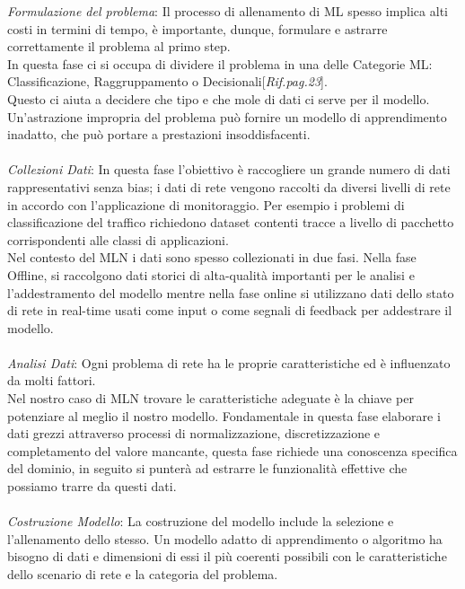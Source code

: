 \documentclass[../tesi.tex]{subfiles}
\begin{document}
\textit{Formulazione del problema}: Il processo di allenamento di ML spesso implica alti costi in termini di tempo, è importante, dunque, formulare e astrarre correttamente il problema al primo step.\\
In questa fase ci si occupa di dividere il problema in una delle Categorie ML: Classificazione, Raggruppamento o Decisionali[\textit{Rif.pag.23}].\\
Questo ci aiuta a decidere che tipo e che mole di dati ci serve per il modello.\\
Un'astrazione impropria del problema può fornire un modello di apprendimento inadatto, che può portare a prestazioni insoddisfacenti.\\
\\
\textit{Collezioni Dati}: In questa fase l’obiettivo è raccogliere un grande numero di dati rappresentativi senza \Gls{bias}; i dati di rete vengono raccolti da diversi livelli di rete in  accordo con l’applicazione di monitoraggio. Per esempio i problemi di classificazione del traffico  richiedono dataset contenti tracce a livello di pacchetto corrispondenti alle classi di applicazioni.\\
Nel contesto del MLN i dati sono spesso collezionati in due fasi.
Nella fase Offline, si raccolgono dati storici di alta-qualità importanti per le analisi e l’addestramento del modello mentre nella fase online si utilizzano dati dello stato di rete in real-time usati come input o come segnali di feedback per addestrare il modello.\\
\\
\textit{Analisi Dati}: Ogni problema di rete ha le proprie caratteristiche ed è influenzato da molti fattori.\\ 
Nel nostro caso di MLN trovare le caratteristiche adeguate è la chiave per potenziare al meglio il nostro modello.
Fondamentale in questa fase elaborare i dati grezzi attraverso processi di normalizzazione, discretizzazione e completamento del valore mancante, questa fase richiede una conoscenza specifica del dominio, in seguito si punterà ad estrarre le funzionalità effettive che possiamo trarre da questi dati.\\
\\
\textit{Costruzione Modello}: La costruzione del modello include la selezione e l’allenamento dello stesso. 
Un modello adatto di apprendimento o algoritmo ha bisogno di dati e dimensioni di essi il più coerenti possibili con le caratteristiche dello scenario di rete e la categoria del problema.\\
\end{document}
